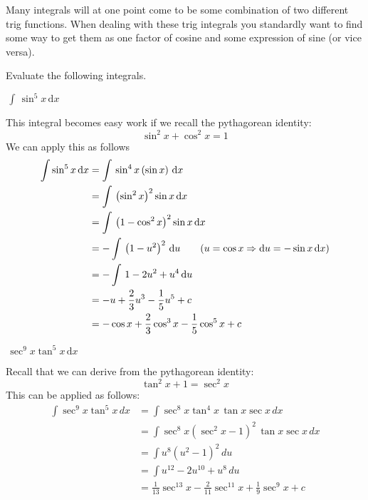 \documentclass[addpoints]{exam}
\theoremstyle{definition}
\theoremstyle{plain}
\renewcommand{\implies}{\Rightarrow}
\begin{document}
\newpage 

\begin{tcolorbox}[breakable, title=\subsection{TRIG INTEGRALS}, colframe=black, sharp corners, colback=Azure4!70, colbacktitle=DeepPink2!60, coltitle=black]
Many integrals will at one point come to be some combination of two different trig functions. When dealing with these trig integrals you standardly want to find some way to get them as one factor of cosine and some expression of sine (or vice versa).  
\end{tcolorbox}
Evaluate the following integrals.
\begin{questions}
    \question $\displaystyle\,\int\,\sin^{5}x\,\mathrm{d}x$
    \begin{solution}[\stretch{1}]
        This integral becomes easy work if we recall the pythagorean identity: 
        \[
        \sin^{2}x + \cos^{2}x = 1
        \]
        We can apply this as follows
        \begin{align*}
            \int \sin^{5}x\,\mathrm{d}x &= \int\,\sin^{4}x\left(\sin x\right)\,\mathrm{d}x \\
            &= \int\,\left(\sin^{2}x\right)^2\sin x\,\mathrm{d}x \\
            &= \int\,\left(1-\cos^{2}x\right)^2\sin x\,\mathrm{d}x \\
            &= -\int\,\left(1-u^2\right)^2\,\mathrm{d}u \tag{$u=\cos x\implies \mathrm{d}u = -\sin x\,\mathrm{d}x$} \\
            &= -\int\,1 - 2u^2 + u^4\,\mathrm{d}u \\
            &= -u + \frac{2}{3}u^{3} - \frac{1}{5}u^5 + c \\
            &= -\cos x + \frac{2}{3}\cos^{3}x - \frac{1}{5}\cos^{5}x + c
        \end{align*}
    \end{solution}

    \question $\displaystyle\,\sec^{9}x\tan^{5}x\,\mathrm{d}x$
    \begin{solution}[\stretch{1}]
        Recall that we can derive from the pythagorean identity:
        \[
            \tan^{2}x + 1 = \sec^{2} x
        \]
        This can be applied as follows:
        \begin{align*}\int{{ \sec^9 x \tan^5 x \,dx}} & = \int{{ \sec^8 x \tan^4 x\,\tan x\sec x\,dx}}\\ &  = \int{{{{\sec }^8}x{{\left( {{{\sec }^2}x - 1} \right)}^2}\,\tan x\sec x\,dx}}\tag{$u = \sec x$}\\ &  = \int{{{u^8}{{\left( {{u^2} - 1} \right)}^2}\,du}}\\ &  = \int{{{u^{12}} - 2{u^{10}} + {u^8}\,du}}\\ &  = \frac{1}{{13}}{\sec ^{13}}x - \frac{2}{{11}}{\sec ^{11}}x + \frac{1}{9}{\sec ^9}x + c\end{align*}
    \end{solution}
    
\end{questions}
\end{document}
